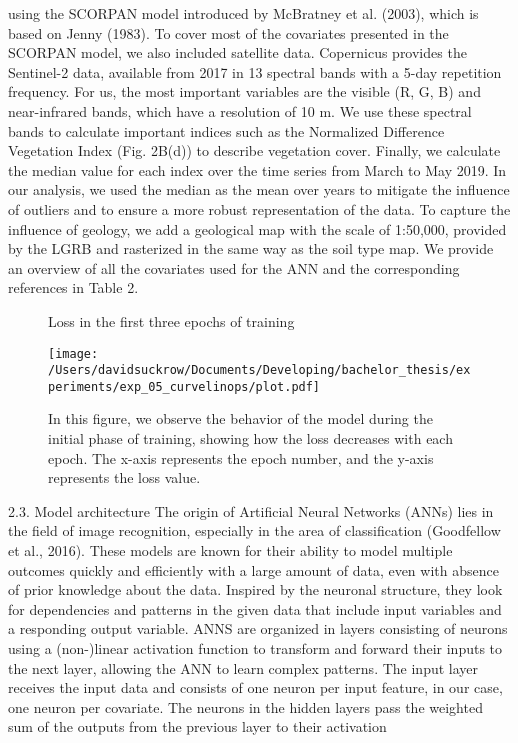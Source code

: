 using the SCORPAN model introduced by McBratney et al. (2003),
which is based on Jenny (1983). To cover most of the covariates presented
in the SCORPAN model, we also included satellite data. Copernicus
provides the Sentinel-2 data, available from 2017 in 13 spectral
bands with a 5-day repetition frequency. For us, the most important
variables are the visible (R, G, B) and near-infrared bands, which have a
resolution of 10 m. We use these spectral bands to calculate important
indices such as the Normalized Difference Vegetation Index (Fig. 2B(d))
to describe vegetation cover. Finally, we calculate the median value for
each index over the time series from March to May 2019. In our analysis,
we used the median as the mean over years to mitigate the influence of
outliers and to ensure a more robust representation of the data. To
capture the influence of geology, we add a geological map with the scale
of 1:50,000, provided by the LGRB and rasterized in the same way as the
soil type map. We provide an overview of all the covariates used for the
ANN and the corresponding references in Table 2.

\begin{figure}[h]
    \centering
    \caption{Loss in the first three epochs of training}  %
    \texttt{[image: /Users/davidsuckrow/Documents/Developing/bachelor\_thesis/experiments/exp\_05\_curvelinops/plot.pdf]}  %
    \captionsetup{justification=justified}  %
    \hfill \caption*{In this figure, we observe the behavior of the model during the initial phase of training, showing how the loss decreases with each epoch. The x-axis represents the epoch number, and the y-axis represents the loss value.}  %
    \captionsetup{justification=centering}
    \label{fig:example}
\end{figure}


2.3. Model architecture
The origin of Artificial Neural Networks (ANNs) lies in the field of
image recognition, especially in the area of classification (Goodfellow
et al., 2016). These models are known for their ability to model multiple
outcomes quickly and efficiently with a large amount of data, even with
absence of prior knowledge about the data. Inspired by the neuronal
structure, they look for dependencies and patterns in the given data that
include input variables and a responding output variable. ANNS are
organized in layers consisting of neurons using a (non-)linear activation
function to transform and forward their inputs to the next layer,
allowing the ANN to learn complex patterns. The input layer receives the
input data and consists of one neuron per input feature, in our case, one
neuron per covariate. The neurons in the hidden layers pass the
weighted sum of the outputs from the previous layer to their activation




